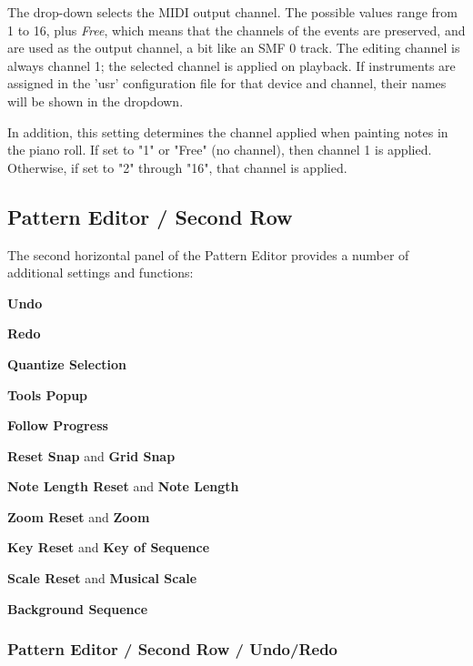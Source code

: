    The drop-down selects the MIDI output channel.
   The possible values range from 1 to 16, plus \textsl{Free}, which means
   that the channels of the events are preserved, and are used as the output
   channel, a bit like an SMF 0 track.
   The editing channel is always channel 1; the selected channel is applied
   on playback.
   If instruments are assigned in the 'usr' configuration file
   for that device and channel, their names will be shown in the dropdown.

   In addition, this setting determines the channel applied when painting notes
   in the piano roll.  If set to "1" or "Free" (no channel), then channel 1 is
   applied.  Otherwise, if set to "2" through "16", that channel is applied.

\subsection{Pattern Editor / Second Row}
\label{subsec:pattern_editor_second_row}

   The second horizontal panel of the Pattern Editor provides a number
   of additional settings and functions:

   \begin{enumber}
      \item \textbf{Undo}
      \item \textbf{Redo}
      \item \textbf{Quantize Selection}
      \item \textbf{Tools Popup}
      \item \textbf{Follow Progress}
      \item \textbf{Reset Snap} and \textbf{Grid Snap}
      \item \textbf{Note Length Reset} and \textbf{Note Length}
      \item \textbf{Zoom Reset} and \textbf{Zoom}
      \item \textbf{Key Reset} and \textbf{Key of Sequence}
      \item \textbf{Scale Reset} and \textbf{Musical Scale}
      \item \textbf{Background Sequence}
   \end{enumber}

\subsubsection{Pattern Editor / Second Row / Undo/Redo}
\label{subsubsec:pattern_editor_second_row_undo_redo}

